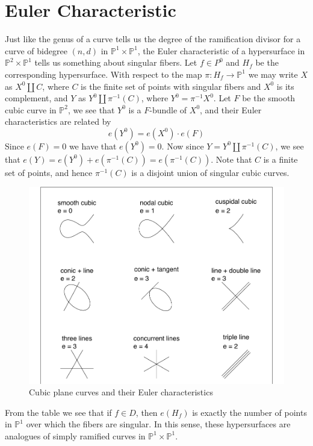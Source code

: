 \documentclass[12pt]{article}
\theoremstyle{plain}
\theoremstyle{definition}
\newcommand{\IP}{\mathbb{P}}
\newcommand{\<}{\langle}
\renewcommand{\>}{\rangle}
\begin{document}
\section{Euler Characteristic}
Just like the genus of a curve tells us the degree of the ramification divisor for a curve of bidegree $(n, d)$ in $\IP^1 \times \IP^1$, the Euler characteristic of a hypersurface in $\IP^2 \times \IP^1$ tells us something about singular fibers. Let $f \in P^0$ and $H_f$ be the corresponding hypersurface. With respect to the map $\pi : H_f \to \IP^1$ we may write $X$ as $X^0 \coprod C$, where $C$ is the finite set of points with singular fibers and $X^0$ is its complement, and $Y$ as $Y^0 \coprod \pi^{-1}(C)$, where $Y^0 = \pi^{-1} X^0$. Let $F$ be the smooth cubic curve in $\IP^2$, we see that $Y^0$ is a $F$-bundle of $X^0$, and their Euler characteristics are related by 
$$ e(Y^0) = e(X^0 ) \cdot e(F) $$ 
Since $e(F) = 0$ we have that $e(Y^0) = 0$. Now since $Y = Y^0 \coprod \pi^{-1}(C)$, we see that $e(Y) = e(Y^0) + e(\pi^{-1}(C)) = e(\pi^{-1}(C))$. Note that $C$ is a finite set of points, and hence $\pi^{-1} (C)$ is a disjoint union of singular cubic curves. 

\begin{figure}[h!]
  \centering
      \includegraphics[width=1.0\textwidth]{planecubics}
  \caption{Cubic plane curves and their Euler characteristics \cite{Pic}}
\end{figure}
From the table we see that if $f \in D$, then $e(H_f)$ is exactly the number of points in $\IP^1$ over which the fibers are singular. In this sense, these hypersurfaces are analogues of simply ramified curves in $\IP^1 \times \IP^1$. 
\end{document}
